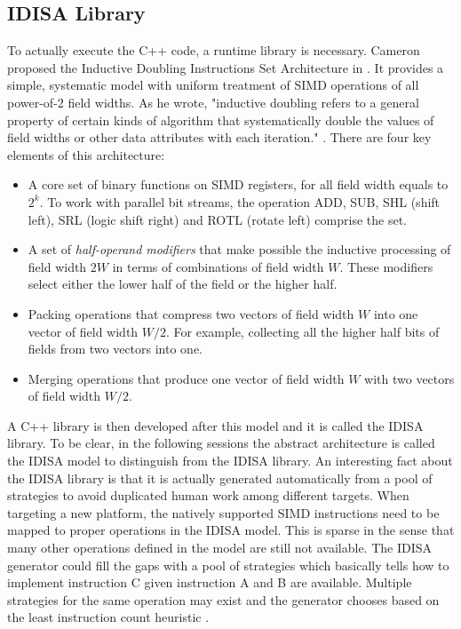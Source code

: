 \subsection{IDISA Library}
To actually execute the C++ code, a runtime library is necessary. Cameron proposed the Inductive Doubling Instructions Set Architecture in \cite{inductive_doubling_principle}. It provides a simple, systematic model with uniform treatment of SIMD operations of all power-of-2 field widths. As he wrote, "inductive doubling refers to a general property of certain kinds of algorithm that systematically double the values of field widths or other data attributes with each iteration." \cite{inductive_doubling_principle}. There are four key elements of this architecture:
\begin{itemize}
    \item A core set of binary functions on SIMD registers, for all field width equals to $2^k$. To work with parallel bit streams, the operation ADD, SUB, SHL (shift left), SRL (logic shift right) and ROTL (rotate left) comprise the set.
    \item A set of \textit{half-operand modifiers} that make possible the inductive processing of field width $2W$ in terms of combinations of field width $W$. These modifiers select either the lower half of the field or the higher half.
    \item Packing operations that compress two vectors of field width $W$ into one vector of field width $W/2$. For example, collecting all the higher half bits of fields from two vectors into one.
    \item Merging operations that produce one vector of field width $W$ with two vectors of field width $W/2$.
\end{itemize}

A C++ library is then developed after this model and it is called the IDISA library. To be clear, in the following sessions the abstract architecture is called the IDISA model to distinguish from the IDISA library. An interesting fact about the IDISA library is that it is actually generated automatically from a pool of strategies to avoid duplicated human work among different targets. When targeting a new platform, the natively supported SIMD instructions need to be mapped to proper operations in the IDISA model. This is sparse in the sense that many other operations defined in the model are still not available. The IDISA generator could fill the gaps with a pool of strategies which basically tells how to implement instruction C given instruction A and B are available. Multiple strategies for the same operation may exist and the generator chooses based on the least instruction count heuristic \cite{hua_idisa}.

